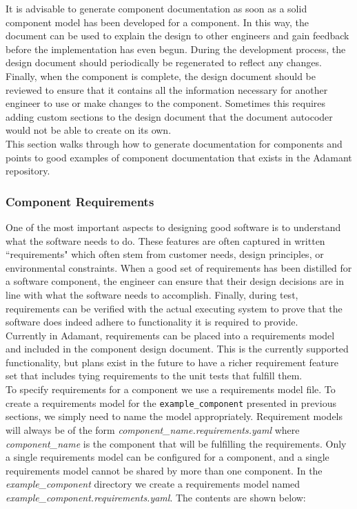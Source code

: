 It is advisable to generate component documentation as soon as a solid component model has been developed for a component. In this way, the document can be used to explain the design to other engineers and gain feedback before the implementation has even begun. During the development process, the design document should periodically be regenerated to reflect any changes. Finally, when the component is complete, the design document should be reviewed to ensure that it contains all the information necessary for another engineer to use or make changes to the component. Sometimes this requires adding custom sections to the design document that the document autocoder would not be able to create on its own. \\

This section walks through how to generate documentation for components and points to good examples of component documentation that exists in the Adamant repository.

\subsubsection{Component Requirements}

One of the most important aspects to designing good software is to understand what the software needs to do. These features are often captured in written ``requirements" which often stem from customer needs, design principles, or environmental constraints. When a good set of requirements has been distilled for a software component, the engineer can ensure that their design decisions are in line with what the software needs to accomplish. Finally, during test, requirements can be verified with the actual executing system to prove that the software does indeed adhere to functionality it is required to provide. \\

Currently in Adamant, requirements can be placed into a requirements model and included in the component design document. This is the currently supported functionality, but plans exist in the future to have a richer requirement feature set that includes tying requirements to the unit tests that fulfill them. \\

To specify requirements for a component we use a requirements model file. To create a requirements model for the \texttt{example\_component} presented in previous sections, we simply need to name the model appropriately. Requirement models will always be of the form \textit{component\_name.requirements.yaml} where \textit{component\_name} is the component that will be fulfilling the requirements. Only a single requirements model can be configured for a component, and a single requirements model cannot be shared by more than one component. In the \textit{example\_component} directory we create a requirements model named \textit{example\_component.requirements.yaml}. The contents are shown below: \\

